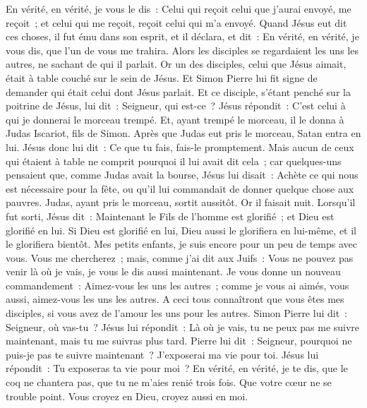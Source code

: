 \begin{multicols}{2}
En vérité, en vérité, je vous le dis~: Celui qui reçoit celui que j'aurai envoyé, me reçoit~; et celui qui me reçoit, reçoit celui qui m'a envoyé.
Quand Jésus eut dit ces choses, il fut ému dans son esprit, et il déclara, et dit~: En vérité, en vérité, je vous dis, que l'un de vous me trahira.
Alors les disciples se regardaient les uns les autres, ne sachant de qui il parlait.
Or un des disciples, celui que Jésus aimait, était à table couché sur le sein de Jésus.
Et Simon Pierre lui fit signe de demander qui était celui dont Jésus parlait.
Et ce disciple, s'étant penché sur la poitrine de Jésus, lui dit~: Seigneur, qui est-ce~?
Jésus répondit~: C'est celui à qui je donnerai le morceau trempé. Et, ayant trempé le morceau, il le donna à Judas Iscariot, fils de Simon.
Après que Judas eut pris le morceau, Satan entra en lui. Jésus donc lui dit~: Ce que tu fais, fais-le promptement.
Mais aucun de ceux qui étaient à table ne comprit pourquoi il lui avait dit cela~;
car quelques-uns pensaient que, comme Judas avait la bourse, Jésus lui disait~: Achète ce qui nous est nécessaire pour la fête, ou qu'il lui commandait de donner quelque chose aux pauvres.
Judas, ayant pris le morceau, sortit aussitôt. Or il faisait nuit.
Lorsqu'il fut sorti, Jésus dit~: Maintenant le Fils de l'homme est glorifié~; et Dieu est glorifié en lui.
Si Dieu est glorifié en lui, Dieu aussi le glorifiera en lui-même, et il le glorifiera bientôt.
Mes petits enfants, je suis encore pour un peu de temps avec vous. Vous me chercherez~; mais, comme j'ai dit aux Juifs~: Vous ne pouvez pas venir là où je vais, je vous le dis aussi maintenant.
Je vous donne un nouveau commandement~: Aimez-vous les uns les autres~; comme je vous ai aimés, vous aussi, aimez-vous les uns les autres.
A ceci tous connaîtront que vous êtes mes disciples, si vous avez de l'amour les uns pour les autres.
Simon Pierre lui dit~: Seigneur, où vas-tu~? Jésus lui répondit~: Là où je vais, tu ne peux pas me suivre maintenant, mais tu me suivras plus tard.
Pierre lui dit~: Seigneur, pourquoi ne puis-je pas te suivre maintenant~? J'exposerai ma vie pour toi.
Jésus lui répondit~: Tu exposeras ta vie pour moi~? En vérité, en vérité, je te dis, que le coq ne chantera pas, que tu ne m'aies renié trois fois.
\VerseOne{}Que votre cœur ne se trouble point. Vous croyez en Dieu, croyez aussi en moi.

\end{multicols}
